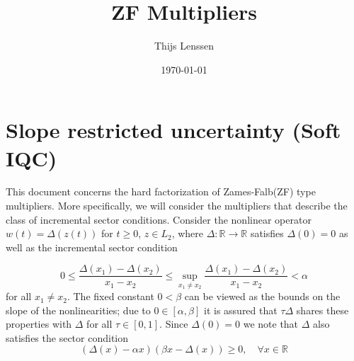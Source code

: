 \documentclass[11pt,a4paper,onecolumn]{article}
\title{ZF Multipliers}
\author{Thijs Lenssen}
\date{\today}
\theoremstyle{definition}
\theoremstyle{remark}
\begin{document}
\maketitle

\section{Slope restricted uncertainty (Soft IQC) \cite{turner2022zamesfalbmultipliersdontpanic}}

This document concerns the hard factorization of Zames-Falb(ZF) type multipliers. More specifically,
we will consider the multipliers that describe the class of incremental sector conditions. Consider the 
nonlinear operator $w(t) = \Delta(z(t))$ for $t \geq 0$,
$z\in L_2$, where ${\Delta}:\mathbb{R}\to\mathbb{R}$ satisfies ${\Delta}(0)=0$ as well
as the incremental sector condition

\begin{equation}\label{eqn:inc-sec}
    0 \leq \frac{{\Delta}(x_1) - {\Delta}(x_2)}{x_1 - x_2} \leq \sup_{x_1 \neq x_2} \frac{{\Delta}(x_1) - {\Delta}(x_2)}{x_1 - x_2} < \alpha
\end{equation}
for all $x_1 \neq x_2$. The fixed constant $0<\beta$ can be viewed as the bounds on the slope of the 
nonlinearities; due to $0\in[\alpha,\beta]$ it is assured that $\tau{\Delta}$ shares these properties with
${\Delta}$ for all $\tau\in[0,1]$. Since ${\Delta}(0)=0$ we note that ${\Delta}$ also satisfies
the sector condition
\begin{equation}
    ({\Delta}(x) - \alpha x)(\beta x - {\Delta}(x)) \geq 0, \quad \forall x\in\mathbb{R}
\end{equation}
\end{document}
